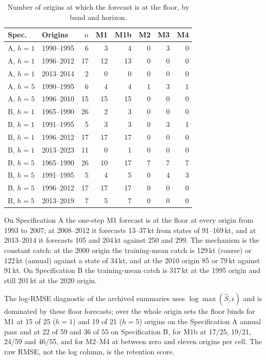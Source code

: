 \documentclass[preprint,11pt,authoryear]{elsarticle}
\theoremstyle{remark}
\begin{document}
\begin{table}[!htb]
\centering\small
\caption{Number of origins at which the forecast is at the floor, by band and horizon.}
\label{tab:si_floor}
\begin{tabular}{@{}llrrrrrr@{}}
\toprule
Spec. & Origins & $n$ & M1 & M1b & M2 & M3 & M4 \\
\midrule
A, $h=1$ & 1990--1995 & 6 & 3 & 4 & 0 & 3 & 0 \\
A, $h=1$ & 1996--2012 & 17 & 12 & 13 & 0 & 0 & 0 \\
A, $h=1$ & 2013--2014 & 2 & 0 & 0 & 0 & 0 & 0 \\
A, $h=5$ & 1990--1995 & 6 & 4 & 4 & 1 & 3 & 1 \\
A, $h=5$ & 1996--2010 & 15 & 15 & 15 & 0 & 0 & 0 \\
B, $h=1$ & 1965--1990 & 26 & 2 & 3 & 0 & 0 & 0 \\
B, $h=1$ & 1991--1995 & 5 & 3 & 3 & 0 & 3 & 1 \\
B, $h=1$ & 1996--2012 & 17 & 17 & 17 & 0 & 0 & 0 \\
B, $h=1$ & 2013--2023 & 11 & 0 & 1 & 0 & 0 & 0 \\
B, $h=5$ & 1965--1990 & 26 & 10 & 17 & 7 & 7 & 7 \\
B, $h=5$ & 1991--1995 & 5 & 4 & 5 & 0 & 4 & 3 \\
B, $h=5$ & 1996--2012 & 17 & 17 & 17 & 0 & 0 & 0 \\
B, $h=5$ & 2013--2019 & 7 & 5 & 7 & 0 & 0 & 0 \\
\bottomrule
\end{tabular}
\end{table}

On Specification A the one-step M1 forecast is at the floor at every origin from 1993 to 2007; at 2008--2012 it forecasts 13--37\,kt from states of 91--169\,kt, and at 2013--2014 it forecasts 105 and 204\,kt against 250 and 299. The mechanism is the constant catch: at the 2000 origin the training-mean catch is 129\,kt (coarse) or 122\,kt (annual) against a state of 34\,kt, and at the 2010 origin 85 or 79\,kt against 91\,kt. On Specification B the training-mean catch is 317\,kt at the 1995 origin and still 201\,kt at the 2020 origin.

The log-RMSE diagnostic of the archived summaries uses $\log\max(\hat S,\epsilon)$ and is dominated by these floor forecasts; over the whole origin sets the floor binds for M1 at 15 of 25 ($h=1$) and 19 of 21 ($h=5$) origins on the Specification A annual pass and at 22 of 59 and 36 of 55 on Specification B, for M1b at 17/25, 19/21, 24/59 and 46/55, and for M2--M4 at between zero and eleven origins per cell. The raw RMSE, not the log column, is the retention score.
\end{document}
